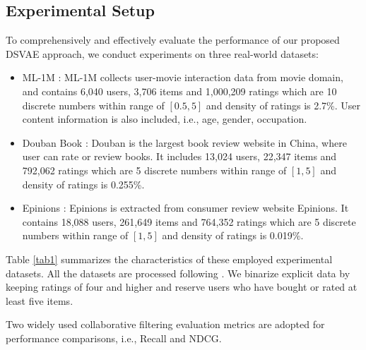 \subsection{Experimental Setup}\label{41}
To comprehensively and effectively evaluate the performance of our proposed DSVAE approach, we conduct experiments on three real-world datasets: 
\begin{itemize}
\item ML-1M \cite{DBLP:journals/tiis/HarperK16}: ML-1M collects user-movie interaction data from movie domain, and contains 6,040 users, 3,706 items and 1,000,209 ratings which are 10 discrete numbers within range of $\left[0.5,5\right]$ and density of ratings is 2.7\%.
User content information is also included, i.e., age, gender, occupation.


\item Douban Book \cite{DBLP:journals/tmm/ZhaoQX16}: Douban is the largest book review website in China, where user can rate or review books. It includes 13,024 users, 22,347 items and 792,062 ratings which are 5 discrete numbers within range of $\left[1,5\right]$ and density of ratings is 0.255\%.

\item Epinions \cite{DBLP:conf/recsys/MassaA07}:
Epinions is extracted from consumer review website Epinions. It contains 18,088 users, 261,649 items and 764,352 ratings which are 5 discrete numbers within range of $\left[1,5\right]$ and density of ratings is 0.019\%.

\end{itemize}

Table \ref{tab1} summarizes the characteristics of these employed experimental datasets. All the datasets are processed following \cite{DBLP:conf/www/LiangKHJ18}. We binarize explicit data by keeping ratings of four and higher and reserve users who have bought or rated at least five items.


Two widely used collaborative filtering evaluation metrics are adopted for performance comparisons, i.e., Recall and NDCG.


